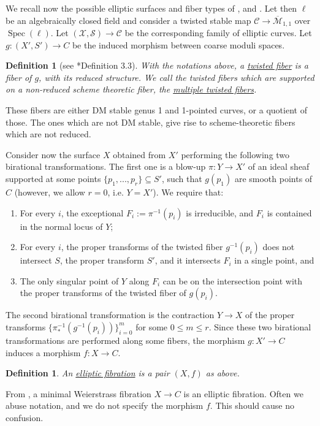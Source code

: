 \documentclass[11pt]{amsart}
\newcommand{\spec}{\operatorname{Spec}}
\newtheorem{Def}[theorem]{Definition}
\theoremstyle{definition}
\begin{document}
We recall now the possible elliptic surfaces and fiber types of \cite{LaNave}, \cite{AB1} and \cite{AB3}.
Let then $\ell$ be an algebraically closed field and consider a twisted stable map $\mathcal{C} \to \overline{\mathcal{M}}_{1,1}$ over $\spec(\ell)$.
Let $(\mathcal{X},\mathcal{S}) \to \mathcal{C}$ be the
corresponding family of elliptic curves. Let $g:(X',S') \to C$ be the induced morphism between coarse moduli spaces. 
\begin{Def}[see \cite{AB3}*{Definition 3.3}]
 With the notations above, a \underline{twisted fiber} is a fiber of $g$, with its reduced structure. We call the twisted fibers which are supported on a non-reduced scheme theoretic fiber, the \underline{multiple twisted fibers}. \end{Def}
 These fibers are either DM stable genus 1 and 1-pointed curves, or a quotient of those. The ones which are not DM stable, give rise to scheme-theoretic fibers which are not reduced.
 
 
 Consider now the surface $X$ obtained from $X'$ performing the following two birational transformations.
The first one is a blow-up $\pi:Y \to X'$ of an ideal sheaf supported
 at some points $\{p_1,...,p_r\} \subseteq S'$, such that $g(p_1)$ are smooth points of $C$ (however, we allow $r=0$, i.e. $Y=X'$). We require that:
 \begin{enumerate}
  \item For every $i$, the exceptional $F_i:=\pi^{-1}(p_i)$ is irreducible, and $F_i$ is contained in the normal locus of $Y$;
  \item For every $i$, the proper transforms of the twisted fiber $g^{-1}(p_i)$ does not intersect $S$, the proper transform $S'$, and it intersects $F_i$ in a single point, and
  \item The only singular point of $Y$ along $F_i$ can be on the intersection point with the proper transforms of the twisted fiber of $g(p_i)$.
\end{enumerate}
 
 The second birational transformation is the contraction $Y \to X$ of the proper transforms $\{\pi_*^{-1}(g^{-1}(p_i))\}_{i=0}^m$ for some $0 \le m \le r$.
 Since these two birational transformations are performed along some fibers, the morphism $g:X' \to C$ induces a morphism $f:X \to C$.
\begin{Def}
 An \underline{elliptic fibration} is a pair $(X,f)$ as above.
\end{Def}
From \cite{AB1}, a minimal Weierstrass fibration $X \to C$ is an elliptic fibration.
Often we abuse notation, and we do not specify the morphism $f$. This should cause no confusion.
\end{document}
